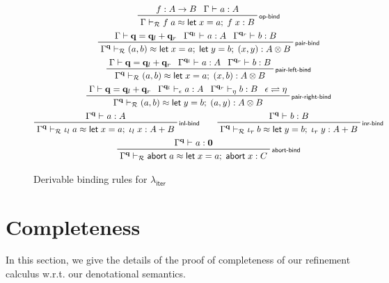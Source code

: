 \documentclass[acmsmall,screen,review]{acmart}
\newcommand{\mc}[1]{\ensuremath{\mathcal{#1}}}
\newcommand{\mb}[1]{\ensuremath{\mathbf{#1}}}
\newcommand{\ms}[1]{\ensuremath{\mathsf{#1}}}
\newcommand{\linl}[1]{\iota_l\;{#1}}
\newcommand{\linr}[1]{\iota_r\;{#1}}
\newcommand{\labort}[1]{\ms{abort}\;{#1}}
\newcommand{\letexpr}[3]{\ensuremath{\ms{let}\;#1 = #2;\;#3}}
\newcommand{\qsp}[4]{#1 \vdash #2 = #3 + #4}
\newcommand{\rle}[1]{{\scriptsize\textsf{#1}}}
\newcommand{\hasty}[4]{#1 \vdash_{#2} #3: {#4}}
\newcommand{\teqv}{\approx}
\newcommand{\tmeq}[5]{#1 \vdash_{#2} #3 \teqv #4 : {#5}}
\newcommand{\subiterexp}{\texorpdfstring{\(\lambda_{\ms{iter}}\)}{lambda-iter}}
\newcommand{\slides}{\rightleftharpoons}
\begin{document}
\begin{figure}
  \begin{adjustbox}{minipage=1.1\textwidth,scale=0.9}
  \begin{gather*}
    \prftree[r]{\rle{op-bind}}
      {f : A \to B}
      {\hasty{\Gamma}{}{a}{A}}
      {\tmeq{\Gamma}{\mc{R}}{f\;a}{\letexpr{x}{a}{f\;x}}{B}} 
      \\
    \prftree[r]{\rle{pair-bind}}
      {\qsp{\Gamma}{\mb{q}}{\mb{q}_l}{\mb{q}_r}}
      {\hasty{\Gamma^{\mb{q}_l}}{}{a}{A}}
      {\hasty{\Gamma^{\mb{q}_r}}{}{b}{B}}
      {\tmeq{\Gamma^{\mb{q}}}{\mc{R}}{(a, b)}{\letexpr{x}{a}{\letexpr{y}{b}{(x, y)}}}{A \otimes B}} 
      \\
    \prftree[r]{\rle{pair-left-bind}}
      {\qsp{\Gamma}{\mb{q}}{\mb{q}_l}{\mb{q}_r}}
      {\hasty{\Gamma^{\mb{q}_l}}{}{a}{A}}
      {\hasty{\Gamma^{\mb{q}_r}}{}{b}{B}}
      {\tmeq{\Gamma^{\mb{q}}}{\mc{R}}{(a, b)}{\letexpr{x}{a}{(x, b)}}{A \otimes B}} 
      \\
    \prftree[r]{\rle{pair-right-bind}}
      {\qsp{\Gamma}{\mb{q}}{\mb{q}_l}{\mb{q}_r}}
      {\hasty{\Gamma^{\mb{q}_l}}{\epsilon}{a}{A}}
      {\hasty{\Gamma^{\mb{q}_r}}{\eta}{b}{B}}
      {\epsilon \slides \eta}
      {\tmeq{\Gamma^{\mb{q}}}{\mc{R}}{(a, b)}{\letexpr{y}{b}{(a, y)}}{A \otimes B}} 
      \\
    \prftree[r]{\rle{inl-bind}}
      {\hasty{\Gamma^{\mb{q}}}{}{a}{A}}
      {\tmeq{\Gamma^{\mb{q}}}{\mc{R}}{\linl{a}}{\letexpr{x}{a}{\linl{x}}}{A + B}} \qquad
    \prftree[r]{\rle{inr-bind}}
      {\hasty{\Gamma^{\mb{q}}}{}{b}{B}}
      {\tmeq{\Gamma^{\mb{q}}}{\mc{R}}
      {\linr{b}}{\letexpr{y}{b}{\linr{y}}}{A + B}} 
      \\
    \prftree[r]{\rle{abort-bind}}
      {\hasty{\Gamma^{\mb{q}}}{}{a}{\mb{0}}}
      {\tmeq{\Gamma^{\mb{q}}}{\mc{R}}{\labort{a}}{\letexpr{x}{a}{\labort{x}}}{C}} 
      \\
  \end{gather*}
  \end{adjustbox}
  \caption{Derivable binding rules for \subiterexp{}}
  \Description{}
  \label{fig:derivable-binding}
\end{figure}

\section{Completeness}

\label{apx:completeness}

In this section, we give the details of the proof of completeness of our refinement calculus w.r.t.
our denotational semantics.
\end{document}
